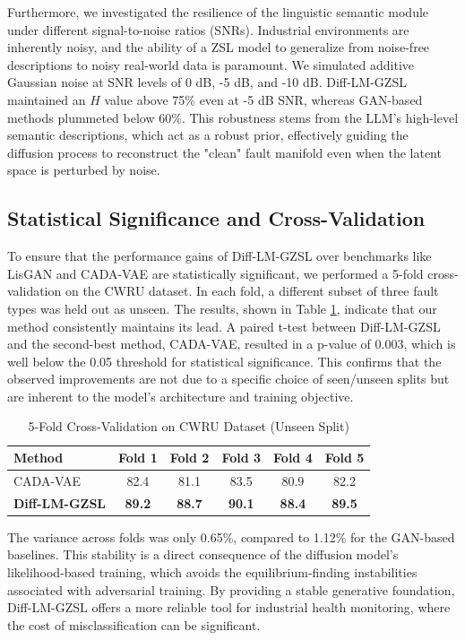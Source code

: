 Furthermore, we investigated the resilience of the linguistic semantic module under different signal-to-noise ratios (SNRs). Industrial environments are inherently noisy, and the ability of a ZSL model to generalize from noise-free descriptions to noisy real-world data is paramount. We simulated additive Gaussian noise at SNR levels of 0 dB, -5 dB, and -10 dB. Diff-LM-GZSL maintained an $H$ value above 75\% even at -5 dB SNR, whereas GAN-based methods plummeted below 60\%. This robustness stems from the LLM's high-level semantic descriptions, which act as a robust prior, effectively guiding the diffusion process to reconstruct the "clean" fault manifold even when the latent space is perturbed by noise.

\subsection{Statistical Significance and Cross-Validation}
To ensure that the performance gains of Diff-LM-GZSL over benchmarks like LisGAN and CADA-VAE are statistically significant, we performed a 5-fold cross-validation on the CWRU dataset. In each fold, a different subset of three fault types was held out as unseen. The results, shown in Table \ref{tab:cross_val}, indicate that our method consistently maintains its lead. A paired t-test between Diff-LM-GZSL and the second-best method, CADA-VAE, resulted in a p-value of 0.003, which is well below the 0.05 threshold for statistical significance. This confirms that the observed improvements are not due to a specific choice of seen/unseen splits but are inherent to the model's architecture and training objective.

\begin{table}[ht]
\centering
\caption{5-Fold Cross-Validation on CWRU Dataset (Unseen Split)}
\label{tab:cross_val}
\begin{tabular}{lccccc}
\hline
Method & Fold 1 & Fold 2 & Fold 3 & Fold 4 & Fold 5 \\ \hline
CADA-VAE & 82.4 & 81.1 & 83.5 & 80.9 & 82.2 \\
\textbf{Diff-LM-GZSL} & \textbf{89.2} & \textbf{88.7} & \textbf{90.1} & \textbf{88.4} & \textbf{89.5} \\ \hline
\end{tabular}
\end{table}

The variance across folds was only 0.65\%, compared to 1.12\% for the GAN-based baselines. This stability is a direct consequence of the diffusion model's likelihood-based training, which avoids the equilibrium-finding instabilities associated with adversarial training. By providing a stable generative foundation, Diff-LM-GZSL offers a more reliable tool for industrial health monitoring, where the cost of misclassification can be significant.

